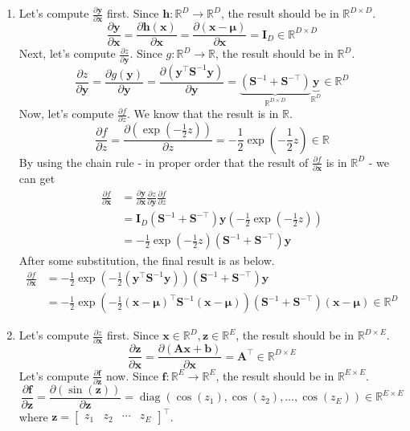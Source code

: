 \documentclass[11pt]{article}
\begin{document}
\begin{enumerate}
\item
Let's compute $\frac{\partial\bm y}{\partial\bm x}$ first.
Since $\bm h:\mathbb{R}^{D}\rightarrow\mathbb{R}^{D}$,
the result should be in $\mathbb{R}^{D\times D}$.
\[\frac{\partial\bm y}{\partial\bm x}
=\frac{\partial\bm h(\bm x)}{\partial\bm x}
=\frac{\partial(\bm{x-\mu})}{\partial\bm x}
=\bm I_{D} \in\mathbb{R}^{D\times D}\]
Next, let's compute $\frac{\partial z}{\partial\bm y}$.
Since $g:\mathbb{R}^{D}\rightarrow\mathbb{R}$,
the result should be in $\mathbb{R}^{D}$.
\[\frac{\partial z}{\partial\bm y}
=\frac{\partial g(\bm y)}{\partial\bm y}
=\frac{\partial(\bm y^{\top}\bm S^{-1}\bm y)}{\partial\bm y}
=\underbrace{(\bm S^{-1}+\bm S^{-\top})}_{\mathbb{R}^{D\times D}}
\underbrace{\bm y}_{\mathbb{R}^{D}} \in\mathbb{R}^{D}\]
Now, let's compute $\frac{\partial f}{\partial z}$.
We know that the result is in $\mathbb{R}$.
\[\frac{\partial f}{\partial z}
=\frac{\partial\left(\exp{\left(-\frac{1}{2}z\right)}\right)}{\partial z}
=-\frac{1}{2}\exp{\left(-\frac{1}{2}z\right)} \in\mathbb{R}\]
By using the chain rule - in proper order
that the result of $\frac{\partial f}{\partial\bm x}$ is in $\mathbb{R}^{D}$
- we can get
\begin{align*}
\frac{\partial f}{\partial\bm x}
& =\frac{\partial\bm y}{\partial\bm x}
\frac{\partial z}{\partial\bm y}
\frac{\partial f}{\partial z} \\
& =\bm I_{D}
(\bm S^{-1}+\bm S^{-\top})\bm y
\left(-\frac{1}{2}\exp{\left(-\frac{1}{2}z\right)}\right) \\
& =-\frac{1}{2}\exp{\left(-\frac{1}{2}z\right)}
(\bm S^{-1}+\bm S^{-\top})\bm y
\end{align*}
After some substitution, the final result is as below.
\begin{align*}
\frac{\partial f}{\partial\bm x}
& =-\frac{1}{2}\exp{\left(-\frac{1}{2}(\bm y^{\top}\bm S^{-1}\bm y)\right)}
(\bm S^{-1}+\bm S^{-\top})\bm y \\
& =-\frac{1}{2}\exp{
\left(-\frac{1}{2}(\bm x-\bm\mu)^{\top}\bm S^{-1}(\bm x-\bm\mu)\right)}
(\bm S^{-1}+\bm S^{-\top})(\bm x-\bm\mu) \in\mathbb{R}^{D}
\end{align*}
\item
Let's compute $\frac{\partial z}{\partial\bm x}$ first.
Since $\bm x\in\mathbb{R}^{D},\bm z\in\mathbb{R}^{E}$,
the result should be in $\mathbb{R}^{D\times E}$.
\[\frac{\partial\bm z}{\partial\bm x}
=\frac{\partial(\bm{Ax+b})}{\partial\bm x}
=\bm A^{\top} \in\mathbb{R}^{D\times E}\]
Let's compute $\frac{\partial\bm f}{\partial\bm z}$ now.
Since $\bm f:\mathbb{R}^{E}\rightarrow\mathbb{R}^{E}$,
the result should be in $\mathbb{R}^{E\times E}$.
\[\frac{\partial\bm f}{\partial\bm z}
=\frac{\partial(\sin{(\bm z)})}{\partial\bm z}
=\operatorname{diag}(\cos{(z_{1})},\cos{(z_{2})},\dots,\cos{(z_{E})})
\in\mathbb{R}^{E\times E}\]
where $\bm z=\begin{bmatrix}z_{1}&z_{2}&\cdots&z_{E}\end{bmatrix}^{\top}$.


\end{enumerate}
\end{document}
